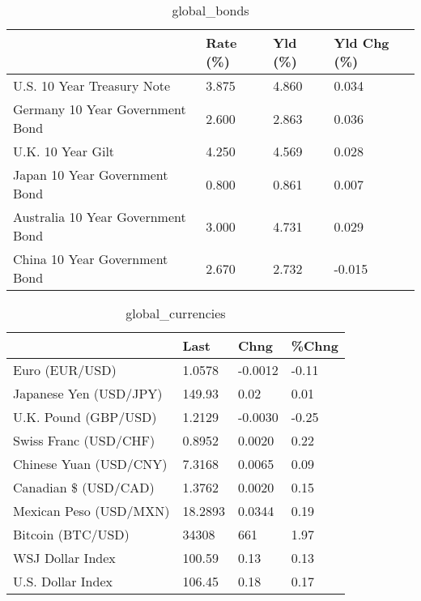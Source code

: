 \documentclass{article}%
\begin{document}
%


\begin{table}[htbp]%
\caption{global\_bonds}%
\centering%
\begin{adjustbox}{width=1\textwidth}%
\begin{tabular}{llll}
\toprule
                                  & Rate (\%) & Yld (\%) & Yld Chg (\%) \\
\midrule
       U.S. 10 Year Treasury Note &    3.875 &   4.860 &       0.034 \\
  Germany 10 Year Government Bond &    2.600 &   2.863 &       0.036 \\
                U.K. 10 Year Gilt &    4.250 &   4.569 &       0.028 \\
    Japan 10 Year Government Bond &    0.800 &   0.861 &       0.007 \\
Australia 10 Year Government Bond &    3.000 &   4.731 &       0.029 \\
    China 10 Year Government Bond &    2.670 &   2.732 &      -0.015 \\
\bottomrule
\end{tabular}
%
\end{adjustbox}%
\end{table}

%


\begin{table}[htbp]%
\caption{global\_currencies}%
\centering%
\begin{adjustbox}{width=1\textwidth}%
\begin{tabular}{llll}
\toprule
                       &    Last &    Chng & \%Chng \\
\midrule
        Euro (EUR/USD) &  1.0578 & -0.0012 & -0.11 \\
Japanese Yen (USD/JPY) &  149.93 &    0.02 &  0.01 \\
  U.K. Pound (GBP/USD) &  1.2129 & -0.0030 & -0.25 \\
 Swiss Franc (USD/CHF) &  0.8952 &  0.0020 &  0.22 \\
Chinese Yuan (USD/CNY) &  7.3168 &  0.0065 &  0.09 \\
  Canadian \$ (USD/CAD) &  1.3762 &  0.0020 &  0.15 \\
Mexican Peso (USD/MXN) & 18.2893 &  0.0344 &  0.19 \\
     Bitcoin (BTC/USD) &   34308 &     661 &  1.97 \\
      WSJ Dollar Index &  100.59 &    0.13 &  0.13 \\
     U.S. Dollar Index &  106.45 &    0.18 &  0.17 \\
\bottomrule
\end{tabular}
%
\end{adjustbox}%
\end{table}
\end{document}
